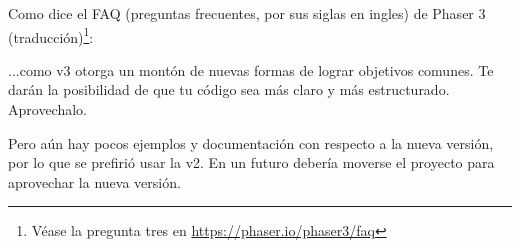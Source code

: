 \documentclass{article}
\begin{document}
	Como dice el FAQ (preguntas frecuentes, por sus siglas en ingles) de Phaser 3 (traducción)\footnote{Véase la pregunta tres en \url{https://phaser.io/phaser3/faq}}:
	\begin{displayquote}
	 	...como v3 otorga un montón de nuevas formas de lograr objetivos comunes. Te darán la posibilidad de que tu código sea más claro y más estructurado. Aprovechalo.
	\end{displayquote}
	
	Pero aún hay pocos ejemplos y documentación con respecto a la nueva versión, por lo que se prefirió usar la v2. En un futuro debería moverse el proyecto para aprovechar la nueva versión.
\end{document}
